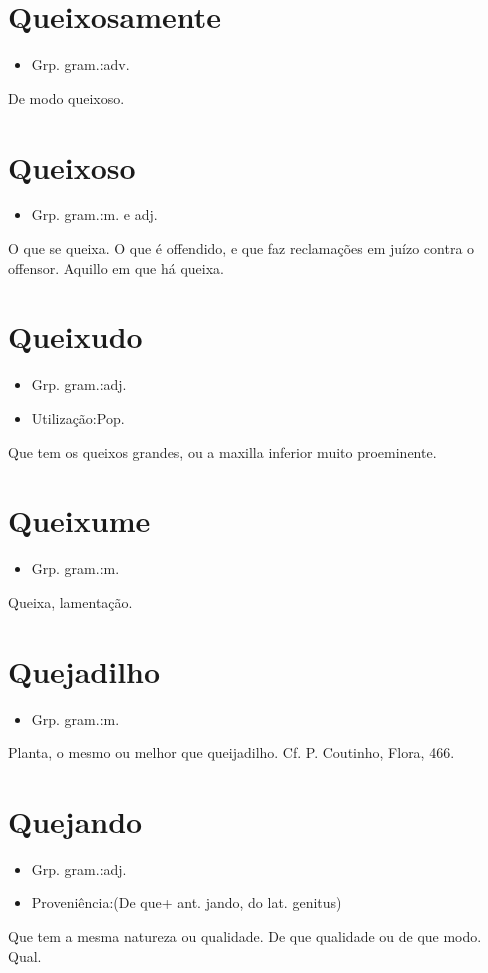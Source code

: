 \section{Queixosamente}
\begin{itemize}
\item {Grp. gram.:adv.}
\end{itemize}
De modo queixoso.
\section{Queixoso}
\begin{itemize}
\item {Grp. gram.:m.  e  adj.}
\end{itemize}
O que se queixa.
O que é offendido, e que faz reclamações em juízo contra o offensor.
Aquillo em que há queixa.
\section{Queixudo}
\begin{itemize}
\item {Grp. gram.:adj.}
\end{itemize}
\begin{itemize}
\item {Utilização:Pop.}
\end{itemize}
Que tem os queixos grandes, ou a maxilla inferior muito proeminente.
\section{Queixume}
\begin{itemize}
\item {Grp. gram.:m.}
\end{itemize}
Queixa, lamentação.
\section{Quejadilho}
\begin{itemize}
\item {Grp. gram.:m.}
\end{itemize}
Planta, o mesmo ou melhor que \textunderscore queijadilho\textunderscore . Cf. P. Coutinho, \textunderscore Flora\textunderscore , 466.
\section{Quejando}
\begin{itemize}
\item {Grp. gram.:adj.}
\end{itemize}
\begin{itemize}
\item {Proveniência:(De \textunderscore que\textunderscore  + ant. \textunderscore jando\textunderscore , do lat. \textunderscore genitus\textunderscore )}
\end{itemize}
Que tem a mesma natureza ou qualidade.
De que qualidade ou de que modo.
Qual.
